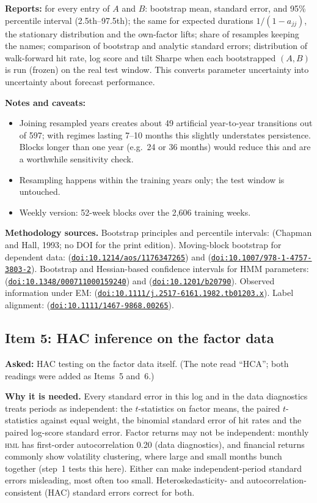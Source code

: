 \documentclass[11pt]{article}
\newcommand{\HML}{\textsc{hml}}
\newcommand{\doi}[1]{\href{https://doi.org/#1}{\nolinkurl{doi:#1}}}
\begin{document}
\textbf{Reports:} for every entry of $A$ and $B$: bootstrap mean, standard error, and 95\% percentile interval (2.5th--97.5th); the same for expected durations $1/(1-a_{jj})$, the stationary distribution and the own-factor lifts; share of resamples keeping the names; comparison of bootstrap and analytic standard errors; distribution of walk-forward hit rate, log score and tilt Sharpe when each bootstrapped $(A,B)$ is run (frozen) on the real test window. This converts parameter uncertainty into uncertainty about forecast performance.

\textbf{Notes and caveats:}
\begin{itemize}
\item Joining resampled years creates about 49 artificial year-to-year transitions out of 597; with regimes lasting 7--10 months this slightly understates persistence. Blocks longer than one year (e.g.\ 24 or 36 months) would reduce this and are a worthwhile sensitivity check.
\item Resampling happens within the training years only; the test window is untouched.
\item Weekly version: 52-week blocks over the 2{,}606 training weeks.
\end{itemize}

\textbf{Methodology sources.} Bootstrap principles and percentile intervals: \citet{efron1993} (Chapman and Hall, 1993; no DOI for the print edition). Moving-block bootstrap for dependent data: \citet{kunsch1989} (\doi{10.1214/aos/1176347265}) and \citet{lahiri2003} (\doi{10.1007/978-1-4757-3803-2}). Bootstrap and Hessian-based confidence intervals for HMM parameters: \citet{visser2000} (\doi{10.1348/000711000159240}) and \citet{zucchini2016} (\doi{10.1201/b20790}). Observed information under EM: \citet{louis1982} (\doi{10.1111/j.2517-6161.1982.tb01203.x}). Label alignment: \citet{stephens2000} (\doi{10.1111/1467-9868.00265}).

\subsection{Item 5: HAC inference on the factor data}\label{sec:hac}
\textbf{Asked:} HAC testing on the factor data itself. (The note read ``HCA''; both readings were added as Items~5 and~6.)

\textbf{Why it is needed.} Every standard error in this log and in the data diagnostics treats periods as independent: the $t$-statistics on factor means, the paired $t$-statistics against equal weight, the binomial standard error of hit rates and the paired log-score standard error. Factor returns may not be independent: monthly \HML{} has first-order autocorrelation 0.20 (data diagnostics), and financial returns commonly show volatility clustering, where large and small months bunch together (step~1 tests this here). Either can make independent-period standard errors misleading, most often too small. Heteroskedasticity- and autocorrelation-consistent (HAC) standard errors correct for both.
\end{document}
